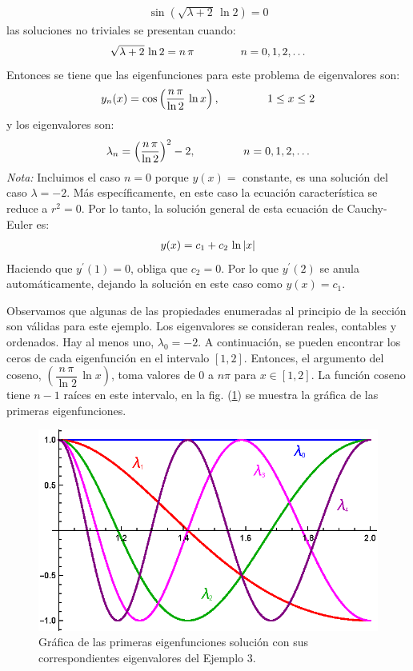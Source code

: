 \documentclass[12pt]{article}
\newcommand{\pderivada}[1]{\ensuremath{{#1}^{\prime}}}
\numberwithin{equation}{section}
\begin{document}
\begin{align*}
\sin \left( \sqrt{\lambda + 2} \, \ln 2 \right) = 0
\end{align*}
las soluciones no triviales se presentan cuando:
\begin{align*}
\sqrt{\lambda + 2} \, \ln 2 = n \, \pi \hspace{1.5cm} n = 0, 1, 2, \ldots
\end{align*}
Entonces se tiene que las eigenfunciones para este problema de eigenvalores son:
\begin{align*}
y_{n} (x) = \cos \left( \dfrac{n \, \pi}{\ln 2} \, \ln x \right), \hspace{1.5cm} 1 \leq x \leq 2
\end{align*}
y los eigenvalores son:
\begin{align*}
\lambda_{n} = \left( \dfrac{n \, \pi}{\ln 2} \right)^{2} - 2, \hspace{1.5cm} n = 0, 1, 2, \ldots
\end{align*}
\emph{Nota:} Incluimos el caso $n = 0$ porque $y (x) =$ constante, es una solución del caso $\lambda = - 2$. Más específicamente, en este caso la ecuación característica se reduce a $r^{2} = 0$. Por lo tanto, la solución general de esta ecuación de Cauchy-Euler es:
\begin{align*}
y (x) = c_{1} + c_{2} \, \ln \abs{x}
\end{align*}
Haciendo que $\pderivada{y} (1) = 0$, obliga que $c_{2} = 0$. Por lo que $\pderivada{y} (2)$ se anula automáticamente, dejando la solución en este caso como $y(x) = c_{1}$.
\par
Observamos que algunas de las propiedades enumeradas al principio de la sección son válidas para este ejemplo. Los eigenvalores se consideran reales, contables y ordenados. Hay al menos uno, $\lambda_{0} = -2$. A continuación, se pueden encontrar los ceros de cada eigenfunción en el intervalo $[1, 2]$. Entonces, el argumento del coseno, $\left( \dfrac{n \, \pi}{\ln 2} \, \ln x \right)$, toma valores de $0$ a $n \pi$ para $x \in [1, 2]$. La función coseno tiene $n - 1$ raíces en este intervalo, en la fig. (\ref{fig:figura_04_02}) se muestra la gráfica de las primeras eigenfunciones.
\begin{figure}[H]
    \centering
    \includegraphics[scale=1.3]{Imagenes/Plot_Ejercicio_SL_03.eps}
    \caption{Gráfica de las primeras eigenfunciones solución con sus correspondientes eigenvalores del Ejemplo 3.}
    \label{fig:figura_04_02}
\end{figure}
\end{document}
